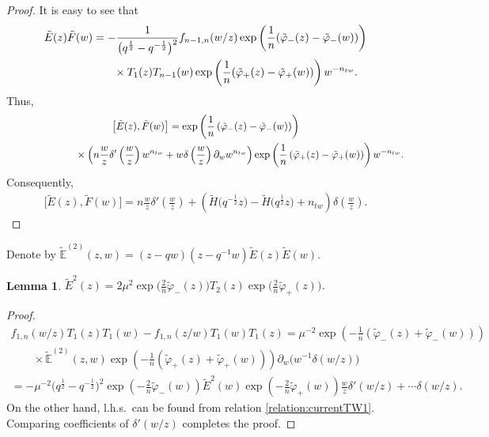\documentclass[pdftex]{sigma}
\numberwithin{equation}{section}
\newtheorem{Lemma}[Theorem]{Lemma}
\theoremstyle{definition}
\newcommand{\half}{\frac{1}{2}}
\newcommand{\tE}{\tilde{E}}
\newcommand{\tF}{\tilde{F}}
\newcommand{\tH}{\tilde{H}}
\newcommand{\tphi}{\tilde{\varphi}}
\newcommand{\tbE}{\tilde{\mathbb{E}}^{(2)}}
\begin{document}
\begin{proof}It is easy to see that
\begin{gather*}
\tE(z) \tF(w) = -\frac{1}{\big(q^{\half}-q^{-\half}\big)^2} f_{n-1,n} (w/z) \exp \left( \frac{1}{n} ( \tphi_- (z) - \tphi_- (w)) \right) \\
\hphantom{\tE(z) \tF(w) =}{}\times T_1 (z) T_{n-1}(w) \exp \left( \frac{1}{n} (\tphi_+ (z) - \tphi_+ (w)) \right) w^{-n_{tw}}.
 \end{gather*}
Thus,
\begin{gather*}
\big[ \tE(z) , \tF(w) \big] = \exp \left( \frac{1}{n} \left(\tphi_- (z) - \tphi_- (w) \right) \right)\\
\hphantom{\big[ \tE(z) , \tF(w) \big] =}{}\times \left( n \frac{w}{z} \delta' \left( \frac{w}{z} \right) w^{n_{tw}} + w \delta \left(\frac{w}{z} \right) \partial_w w^{n_{tw}} \right) \exp \left( \frac{1}{n} \left(\tphi_+ (z) - \tphi_+ (w) \right) \right) w^{-n_{tw}}.
\end{gather*}
Consequently,
\begin{gather*}
\big[\tE(z) , \tF(w)\big] = n \frac{w}{z} \delta' \left(\frac{w}{z} \right) + \left( \tH\big(q^{-\half}z\big) - \tH\big(q^{\half}z\big) + n_{tw} \right) \delta \left(\frac{w}{z} \right).\tag*{\qed}
\end{gather*}\renewcommand{\qed}{}
\end{proof}
Denote by $\tbE(z,w)=(z-qw)(z-q^{-1}w) \tE(z) \tE(w)$.

\begin{Lemma} \label{App:Lemma:E^2}
$\tE^2(z) = 2 \mu^2 \exp \big( \frac{2}{n} \tphi_-(z) \big) T_2(z) \exp \big( \frac{2}{n} \tphi_+(z) \big)$.
\end{Lemma}
\begin{proof}
\begin{gather*}
f_{1,n}(w/z) T_{1}(z) T_{1} (w) - f_{1,n}(z/w) T_1(w) T_1 (z) = \mu^{-2} \exp \left( - \frac{1}{n} \left( \tphi_-(z) + \tphi_- (w) \right) \right) \\
\qquad{}\times \tbE(z,w) \exp \left( - \frac{1}{n} \left( \tphi_+(z) + \tphi_+ (w) \right) \right) \partial_w \big( w^{-1} \delta(w/z) \big) \\
{} =- \mu^{-2}\big(q^{\half}-q^{-\half}\big)^2 \exp \left(- \frac{2}{n} \tphi_-(w) \right) \tE^{2}(w) \exp \left(- \frac{2}{n} \tphi_+(w) \right) \frac{w}{z} \delta'(w/z) + \cdots \delta(w/z).
\end{gather*}
On the other hand, l.h.s.\ can be found from relation \eqref{relation:currentTW1}. Comparing coefficients of $\delta'(w/z)$ completes the proof.
\end{proof}
\end{document}
